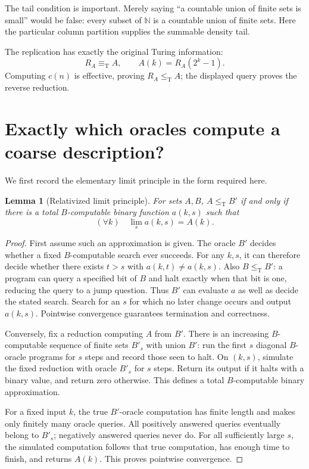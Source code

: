 \documentclass[11pt,a4paper]{article}
\newcommand{\N}{\mathbb N}
\newcommand{\leT}{\leq_{\mathrm T}}
\newcommand{\eqT}{\equiv_{\mathrm T}}
\newtheorem{lemma}[theorem]{Lemma}
\theoremstyle{definition}\newtheorem{definition}[theorem]{Definition}
\theoremstyle{remark}\newtheorem{remark}[theorem]{Remark}
\begin{document}
The tail condition is important. Merely saying ``a countable union of finite sets is small'' would be false: every subset of $\N$ is a countable union of finite sets. Here the particular column partition supplies the summable density tail.

The replication has exactly the original Turing information:
\begin{equation}\label{eq:degreeR}
 R_A\eqT A,\qquad A(k)=R_A(2^k-1).
\end{equation}
Computing $c(n)$ is effective, proving $R_A\leT A$; the displayed query proves the reverse reduction.

\section{Exactly which oracles compute a coarse description?}
\label{sec:limit}
We first record the elementary limit principle in the form required here.

\begin{lemma}[Relativized limit principle]\label{lem:limit}
For sets $A,B$, $A\leT B'$ if and only if there is a total $B$-computable binary function $a(k,s)$ such that
\[
 (\forall k)\quad\lim_s a(k,s)=A(k).
\]
\end{lemma}
\begin{proof}
First assume such an approximation is given. The oracle $B'$ decides whether a fixed $B$-computable search ever succeeds. For any $k,s$, it can therefore decide whether there exists $t>s$ with $a(k,t)\ne a(k,s)$. Also $B\leT B'$: a program can query a specified bit of $B$ and halt exactly when that bit is one, reducing the query to a jump question. Thus $B'$ can evaluate $a$ as well as decide the stated search. Search for an $s$ for which no later change occurs and output $a(k,s)$. Pointwise convergence guarantees termination and correctness.

Conversely, fix a reduction computing $A$ from $B'$. There is an increasing $B$-computable sequence of finite sets $B'_s$ with union $B'$: run the first $s$ diagonal $B$-oracle programs for $s$ steps and record those seen to halt. On $(k,s)$, simulate the fixed reduction with oracle $B'_s$ for $s$ steps. Return its output if it halts with a binary value, and return zero otherwise. This defines a total $B$-computable binary approximation.

For a fixed input $k$, the true $B'$-oracle computation has finite length and makes only finitely many oracle queries. All positively answered queries eventually belong to $B'_s$; negatively answered queries never do. For all sufficiently large $s$, the simulated computation follows that true computation, has enough time to finish, and returns $A(k)$. This proves pointwise convergence.
\end{proof}
\end{document}
